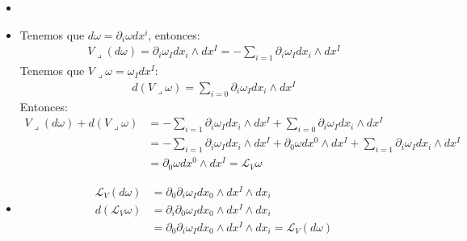 \documentclass{article}
\begin{document}
\begin{itemize}
  \item 

  \item 
    Tenemos que $ d\omega=\partial_i \omega dx^i $, entonces: 
    \begin{gather*}
       V\lrcorner(d\omega) = \partial_i\omega_I dx_i\wedge dx^I = - \displaystyle\sum_{i=1 }^{}\partial_i\omega_I dx_i \wedge dx^I
    \end{gather*}
    Tenemos que $ V \lrcorner \omega = \omega_I dx^I $:
    \begin{gather*}
       d(V \lrcorner \omega) = \displaystyle\sum_{i=0 }^{} \partial_i \omega_I dx_i \wedge dx^I
    \end{gather*}
    Entonces: 
    \begin{align*}
      V\lrcorner(d\omega) + d(V\lrcorner\omega) &= - \displaystyle\sum_{i=1 }^{}\partial_i\omega_I dx_i \wedge dx^I +  \displaystyle\sum_{i=0 }^{} \partial_i \omega_I dx_i \wedge dx^I \\&= - \displaystyle\sum_{i=1 }^{}\partial_i\omega_I dx_i \wedge dx^I + \partial_0\omega dx^0\wedge dx^I +  \displaystyle\sum_{i=1 }^{} \partial_i \omega_I dx_i \wedge dx^I \\
                      &= \partial_0\omega dx^0\wedge dx^I = \mathcal{L}_V \omega 
    \end{align*}

  \item 
    \begin{align*}
      \mathcal L _V (d\omega) &= \partial_0 \partial_i \omega_I dx_0 \wedge dx^I \wedge dx_i  \\
      d(\mathcal L_V \omega) &= \partial_i\partial_0 \omega_I dx_0\wedge dx^I \wedge dx_i \\
                             &= \partial_0 \partial_i \omega_I dx_0 \wedge dx^I \wedge dx_i = \mathcal L_V(d\omega)
    \end{align*}

\end{itemize}
\end{document}
